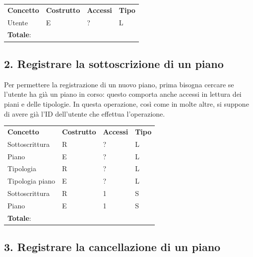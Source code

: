 \documentclass[a4paper,12pt]{report}
\begin{document}
\begin{table}[!htb]
\begin{center}
	\begin{tabular}{ | m{5cm} P{4cm} P{4cm} P{4cm} | }
	 \textbf{Concetto} & \textbf{Costrutto} & \textbf{Accessi} & \textbf{Tipo} \\
	Utente         & E & ? & L \\ \hline
	 \textbf{Totale}: & & & \\ \hline
	\end{tabular}
\end{center}
\end{table}

\subsection*{2. Registrare la sottoscrizione di un piano}

Per permettere la registrazione di un nuovo piano, prima bisogna cercare se l'utente ha già un piano in corso: questo comporta anche accessi in lettura dei piani e delle tipologie.
In questa operazione, così come in molte altre, si suppone di avere già l'ID dell'utente che effettua l'operazione.

\begin{table}[!htb]
\begin{center}
	\begin{tabular}{ | m{5cm} P{4cm} P{4cm} P{4cm} | }
	 \textbf{Concetto} & \textbf{Costrutto} & \textbf{Accessi} & \textbf{Tipo} \\
	Sottoscrittura  & R & ? & L \\ \hline
	Piano           & E & ? & L \\ \hline
	Tipologia       & R & ? & L \\ \hline
	Tipologia piano & E & ? & L \\ \hline
	Sottoscrittura  & R & 1 & S \\ \hline
	Piano           & E & 1 & S \\ \hline
	 \textbf{Totale}: & & & \\ \hline
	\end{tabular}
\end{center}
\end{table}

\newpage

\subsection*{3. Registrare la cancellazione di un piano}
\end{document}
